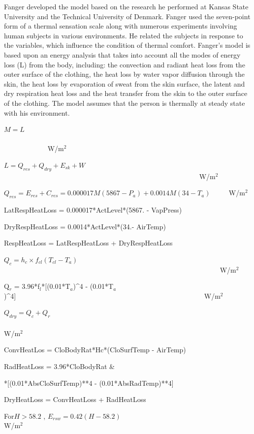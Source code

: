 Fanger developed the model based on the research he performed at Kansas State University and the Technical University of Denmark. Fanger used the seven-point form of a thermal sensation scale along with numerous experiments involving human subjects in various environments. He related the subjects in response to the variables, which influence the condition of thermal comfort. Fanger's model is based upon an energy analysis that takes into account all the modes of energy loss (L) from the body, including: the convection and radiant heat loss from the outer surface of the clothing, the heat loss by water vapor diffusion through the skin, the heat loss by evaporation of sweat from the skin surface, the latent and dry respiration heat loss and the heat transfer from the skin to the outer surface of the clothing. The model assumes that the person is thermally at steady state with his environment.

\(M = L\) ~~~~~~~~~~~~~~~~~~~~~~~~~~~~~~~~~~~~~~~~~~~~~~~~~~~~~~~~~~~~~~~~~~~~~~~~~~~~~~~~~~~~ W/m\(^{2}\)

\(L = {Q_{res}} + {Q_{dry}} + {E_{sk}} + W\) ~~~~~~~~~~~~~~~~~~~~~~~~~~~~~~~~~~~~~~~~~~~~~~~~~~~~~~~~ W/m\(^{2}\)

\({Q_{res}} = {E_{res}} + {C_{res}} = 0.000017M(5867 - {P_a}) + 0.0014M(34 - {T_a})\) ~~~~ W/m\(^{2}\)

LatRespHeatLoss = 0.000017*ActLevel*(5867. - VapPress)

DryRespHeatLoss = 0.0014*ActLevel*(34.- AirTemp)

RespHeatLoss = LatRespHeatLoss + DryRespHeatLoss

\({Q_c} = {h_c} \times {f_{cl}}({T_{cl}} - {T_a})\) ~~~~~~~~~~~~~~~~~~~~~~~~~~~~~~~~~~~~~~~~~~~~~~~~~~~~~~~~~~~~~~ W/m\(^{2}\) 

{Q\(_{r}\) = 3.96*f\(_{l}\)*{[}(0.01*T\(_{a}\))\^{}4 - (0.01*T\(_{a}\))\^{}4{]}}~~~~~~~~~~~~~~~~~~~~~~~~~~~~~~~~~~~~~~~~~~~~~~~~~~~~~~ W/m\(^{2}\)

\({Q_{dry}} = {Q_c} + {Q_r}\) ~~~~~~~~~~~~~~~~~~~~~~~~~~~~~~~~~~~~~~~~~~~~~~~~~~~~~~~~~~~~~~~~~~~~~~~~ W/m\(^{2}\)

ConvHeatLos = CloBodyRat*Hc*(CloSurfTemp - AirTemp)

RadHeatLoss = 3.96*CloBodyRat \&

*{[}(0.01*AbsCloSurfTemp)**4 - (0.01*AbsRadTemp)**4{]}

DryHeatLoss = ConvHeatLoss + RadHeatLoss

For\(H > 58.2\) , \({E_{rsw}} = 0.42(H - 58.2)\) ~~~~~~~~~~~~~~~~~~~~~~~~~~~~~~~~~~~~~ W/m\(^{2}\)

